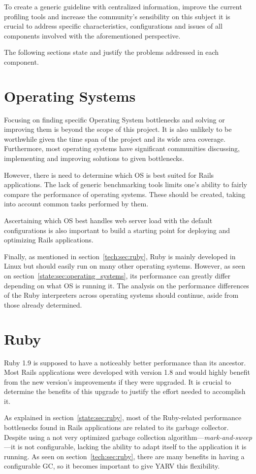 To create a generic guideline with centralized information, improve the current profiling tools and increase the community's sensibility on this subject it is crucial to address specific characteristics, configurations and issues of all components involved with the aforementioned perspective. 

The following sections state and justify the problems addressed in each component.

\section{Operating Systems}
Focusing on finding specific Operating System bottlenecks and solving or improving them is beyond the scope of this project. It is also unlikely to be worthwhile given the time span of the project and its wide area coverage. Furthermore, most operating systems have significant communities discussing, implementing and improving solutions to given bottlenecks.

However, there is need to determine which OS is best suited for Rails applications. The lack of generic benchmarking tools limits one's ability to fairly compare the performance of operating systems. These should be created, taking into account common tasks performed by them. 

Ascertaining which OS best handles web server load with the default configurations is also important to build a starting point for deploying and optimizing Rails applications. 

Finally, as mentioned in section~\ref{tech:sec:ruby}, Ruby is mainly developed in Linux but should easily run on many other operating systems. However, as seen on section~\ref{state:sec:operating_systems}, its performance can greatly differ depending on what OS is running it. The analysis on the performance differences of the Ruby interpreters across operating systems should continue, aside from those already determined.

\section{Ruby}
Ruby 1.9 is supposed to have a noticeably better performance than its ancestor. Most Rails applications were developed with version 1.8 and would highly benefit from the new version's improvements if they were upgraded. It is crucial to determine the benefits of this upgrade to justify the effort needed to accomplish it. 

As explained in section~\ref{state:sec:ruby}, most of the Ruby-related performance bottlenecks found in Rails applications are related to its garbage collector. Despite using a not very optimized garbage collection algorithm---\textit{mark-and-sweep}---it is not configurable, lacking the ability to adapt itself to the application it is running. As seen on section~\ref{tech:sec:ruby}, there are many benefits in having a configurable GC, so it becomes important to give YARV this flexibility. 

